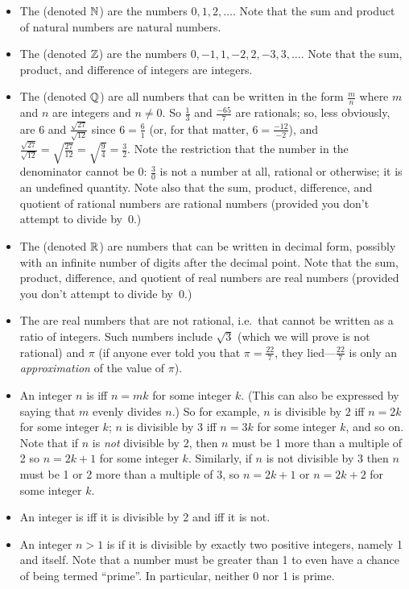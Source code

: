 \begin{itemize}

\item The  (denoted ${\mathbb N}$) are the numbers $0,1,2,\ldots$.  Note that the
sum and product of natural numbers are natural numbers.

\item The  (denoted ${\mathbb Z}$) are the numbers $0, -1, 1, -2, 2, -3, 3, \ldots$.
Note that the sum, product, and difference of integers are integers.

\item The  (denoted ${\mathbb Q}$)
are all numbers that can be written in the form $\frac{m}{n}$
where $m$ and $n$ are integers and $n\not=0$.  So $\frac{1}{3}$ and $\frac{-65}{7}$ are
rationals; so, less obviously, are 6 and $\frac{\sqrt{27}}{\sqrt{12}}$ since $6=\frac{6}{1}$
(or, for that matter, $6=\frac{-12}{-2}$), and $\frac{\sqrt{27}}{\sqrt{12}} = 
\sqrt{\frac{27}{12}} = \sqrt{\frac{9}{4}} = \frac{3}{2}$.  Note the restriction that the
number in the denominator cannot be 0: $\frac{3}{0}$ is not a number at all, rational
or otherwise; it is an undefined quantity.  Note also that the sum, product, difference,
and quotient of rational numbers are rational numbers (provided you don't attempt to divide
by~0.)

\item The  (denoted ${\mathbb R}$) are numbers
that can be written in decimal form, possibly with an infinite number of
digits after the decimal point.  Note that the sum, product, difference,
and quotient of real numbers are real numbers (provided you don't attempt to divide
by~0.)

\item The  are real numbers that are not rational, i.e.\ that cannot
be written as a ratio of integers.  Such numbers include $\sqrt{3}$ (which we will
prove is not rational) and $\pi$ (if anyone ever told you that $\pi = \frac{22}{7}$,
they lied---$\frac{22}{7}$ is only an {\em approximation} of the value of $\pi$).

\item An integer $n$ is  iff $n=mk$ for some integer $k$. (This can also
be expressed by saying that $m$ {\nw evenly divides} $n$.) So
for example, $n$ is divisible by $2$ iff $n=2k$ for some integer $k$; $n$ is divisible
by 3 iff $n=3k$ for some integer $k$, and so on.  Note that if $n$ is {\em not} divisible
by 2, then $n$ must be 1 more than a multiple of 2 so $n=2k+1$ for some integer $k$.
Similarly, if $n$ is not divisible by 3 then $n$ must be 1 or 2 more than a multiple of 3,
so $n=2k+1$ or $n=2k+2$ for some integer $k$.

\item An integer is  iff it is divisible by 2 and  iff it is not.

\item An integer $n>1$ is  if it is divisible by exactly two positive integers, namely 1 and itself.
Note that a number must be greater than 1 to even have a chance of being termed ``prime''.
In particular, neither 0 nor 1 is prime.

\end{itemize}


